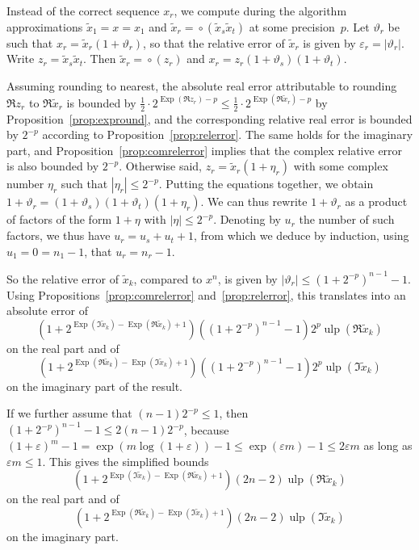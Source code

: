 \documentclass [12pt]{article}
\newcommand {\corr}[1]{{#1}}
\newcommand {\appro}[1]{\widetilde {#1}}
\newcommand {\Ulp}{{\operatorname {ulp}}}
\DeclareMathOperator{\Exp}{\operatorname {Exp}}
\newcommand {\round}{\operatorname {\circ}}
\renewcommand {\epsilon}{\varepsilon}
\renewcommand {\theta}{\vartheta}
\renewcommand {\leq}{\leqslant}
\begin{document}
Instead of the correct sequence $\corr x_r$, we compute during the algorithm
approximations $\appro x_1 = x = \corr x_1$ and
$\appro x_r = \round (\appro x_s \appro x_t)$
at some precision~$p$.
Let $\theta_r$ be such that $\corr x_r = \appro x_r (1 + \theta_r)$, so that
the relative error of $\appro x_r$ is given by $\epsilon_r = |\theta_r|$.
Write $z_r = \appro x_s \appro x_t$.
Then $\appro x_r = \round (z_r)$ and
$\corr x_r = z_r (1 + \theta_s)(1 + \theta_t)$.

Assuming rounding to nearest, the absolute real error attributable to
rounding $\Re z_r$ to $\Re \appro x_r$ is bounded by
$\frac {1}{2} \cdot 2^{\Exp (\Re z_r) - p}
\leq \frac {1}{2} \cdot 2^{\Exp (\Re \appro x_r) - p}$
by Proposition~\ref {prop:expround}, and the corresponding
relative real error is bounded by $2^{-p}$ according to
Proposition~\ref {prop:relerror}. The same holds for the imaginary part,
and Proposition~\ref {prop:comrelerror} implies that the complex
relative error is also bounded by $2^{-p}$. Otherwise said,
$z_r = \appro x_r (1 + \eta_r)$ with
some complex number $\eta_r$ such that $|\eta_r| \leq 2^{-p}$.
Putting the equations together, we obtain
$1 + \theta_r = (1 + \theta_s)(1 + \theta_t)(1 + \eta_r)$.
We can thus rewrite $1 + \theta_r$ as a product of factors of the
form $1 + \eta$ with $|\eta| \leq 2^{-p}$. Denoting by $u_r$ the
number of such factors, we thus have $u_r = u_s + u_t + 1$, from which
we deduce by induction, using $u_1 = 0 = n_1 - 1$,
that $u_r = n_r - 1$.

So the relative error of $\appro x_k$, compared to $x^n$, is given by
$|\theta_r| \leq (1 + 2^{-p})^{n-1} - 1$.
Using Propositions~\ref {prop:comrelerror}
and~\ref {prop:relerror}, this translates into an absolute error of
\[
\left( 1 + 2^{\Exp (\Im \appro x_k) - \Exp (\Re \appro x_k) + 1} \right)
\left( (1 + 2^{-p})^{n-1} - 1 \right)
2^p \Ulp (\Re \appro x_k)
\]
on the real part and of
\[
\left( 1 + 2^{\Exp (\Re \appro x_k) - \Exp (\Im \appro x_k) + 1} \right)
\left( (1 + 2^{-p})^{n-1} - 1 \right)
2^p \Ulp (\Im \appro x_k)
\]
on the imaginary part of the result.

If we further assume that $(n-1) 2^{-p} \leq 1$, then
$(1 + 2^{-p})^{n-1} - 1 \leq 2 (n-1) 2^{-p}$,
because $(1+\varepsilon)^m-1 = \exp(m \log(1+\varepsilon)) - 1
\leq \exp(\varepsilon m) - 1 \leq 2 \varepsilon m$ as long as
$\varepsilon m \leq 1$. This gives the simplified bounds
\begin{equation} \label{eq:powui_re}
\left( 1 + 2^{\Exp (\Im \appro x_k) - \Exp (\Re \appro x_k) + 1} \right)
(2n-2) \Ulp (\Re \appro x_k)
\end{equation}
on the real part and of
\begin{equation} \label{eq:powui_im}
\left( 1 + 2^{\Exp (\Re \appro x_k) - \Exp (\Im \appro x_k) + 1} \right)
(2n-2) \Ulp (\Im \appro x_k)
\end{equation}
on the imaginary part.
\end{document}
